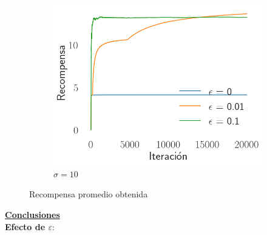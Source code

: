 \documentclass[12pt]{article}
\begin{document}
\begin{figure}[H]
\begin{subfigure}[H]{0.3\textwidth}
            \includegraphics[width=\textwidth]{../img/reward_iteration_sigma_10}
            \caption{$\sigma=10$}
            \label{fig:average_reward_10}
        \end{subfigure}
        \caption{Recompensa promedio obtenida}
        \label{fig:average_reward}
    \end{figure}

    \underline{\textbf{Conclusiones}}\\
    \textbf{Efecto de $\varepsilon$}:\\
\end{document}
